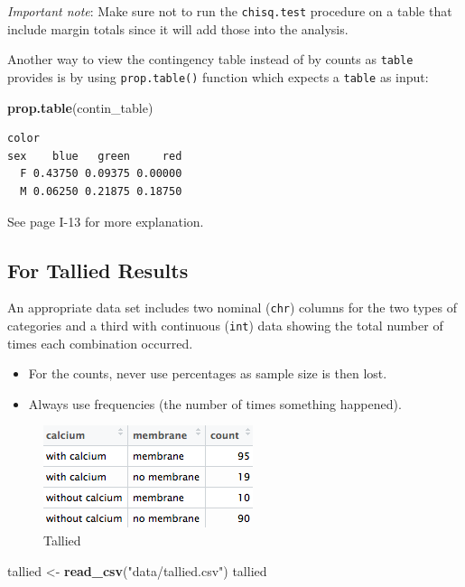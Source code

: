 \documentclass[twoside, 12pt]{article}
\newenvironment{Shaded}{\begin{snugshade}}{\end{snugshade}}
\newcommand{\KeywordTok}[1]{\textcolor[rgb]{0.13,0.29,0.53}{\textbf{{#1}}}}
\newcommand{\StringTok}[1]{\textcolor[rgb]{0.31,0.60,0.02}{{#1}}}
\newcommand{\NormalTok}[1]{{#1}}
\begin{document}
\emph{Important note}: Make sure not to run the \texttt{chisq.test}
procedure on a table that include margin totals since it will add those
into the analysis.

Another way to view the contingency table instead of by counts as
\texttt{table} provides is by using \texttt{prop.table()} function which
expects a \texttt{table} as input:

\begin{Shaded}
\begin{Highlighting}[]
\KeywordTok{prop.table}\NormalTok{(contin_table)}
\end{Highlighting}
\end{Shaded}

\begin{Verbatim}[frame=single]
   color
sex    blue   green     red
  F 0.43750 0.09375 0.00000
  M 0.06250 0.21875 0.18750
\end{Verbatim}

See page I-13 for more explanation.

\subsection*{For Tallied Results}\label{for-tallied-results}

An appropriate data set includes two nominal (\texttt{chr}) columns for
the two types of categories and a third with continuous (\texttt{int})
data showing the total number of times each combination occurred.

\begin{itemize}
\item
  For the counts, never use percentages as sample size is then lost.
\item
  Always use frequencies (the number of times something happened).
\end{itemize}

\begin{figure}[htbp]
\centering
\includegraphics{figure/tallied.png}
\caption{Tallied}
\end{figure}

\begin{Shaded}
\begin{Highlighting}[]
\NormalTok{tallied <-}\StringTok{ }\KeywordTok{read_csv}\NormalTok{(}\StringTok{"data/tallied.csv"}\NormalTok{)}
\NormalTok{tallied}
\end{Highlighting}
\end{Shaded}
\end{document}
